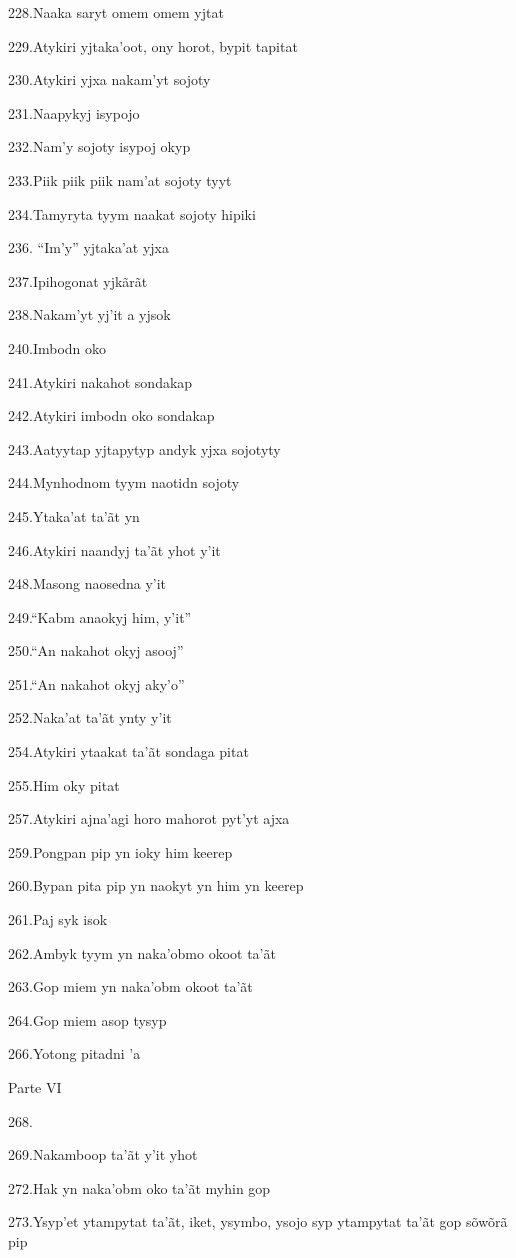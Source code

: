 228.Naaka saryt omem omem yjtat

229.Atykiri yjtaka'oot, ony horot, bypit tapitat

230.Atykiri yjxa nakam'yt sojoty

231.Naapykyj isypojo

232.Nam'y sojoty isypoj okyp

233.Piik piik piik nam'at sojoty tyyt

234.Tamyryta tyym naakat sojoty hipiki

236. ``Im'y'' yjtaka'at yjxa

237.Ipihogonat yjkãrãt

238.Nakam'yt yj'it a yjsok

240.Imbodn oko

241.Atykiri nakahot sondakap

242.Atykiri imbodn oko sondakap

243.Aatyytap yjtapytyp andyk yjxa sojotyty

244.Mynhodnom tyym naotidn sojoty

245.Ytaka'at ta'ãt yn

246.Atykiri naandyj ta'ãt yhot y'it

248.Masong naosedna y'it

249.``Kabm anaokyj him, y'it''

250.``An nakahot okyj asooj''

251.``An nakahot okyj aky'o''

252.Naka'at ta'ãt ynty y'it

254.Atykiri ytaakat ta'ãt sondaga pitat

255.Him oky pitat

257.Atykiri ajna'agi horo mahorot pyt'yt ajxa

259.Pongpan pip yn ioky him keerep

260.Bypan pita pip yn naokyt yn him yn keerep

261.Paj syk isok

262.Ambyk tyym yn naka'obmo okoot ta'ãt

263.Gop miem yn naka'obm okoot ta'ãt

264.Gop miem asop tysyp

266.Yotong pitadni 'a

Parte VI

268.

269.Nakamboop ta'ãt y'it yhot

272.Hak yn naka'obm oko ta'ãt myhin gop

273.Ysyp'et ytampytat ta'ãt, iket, ysymbo, ysojo syp ytampytat ta'ãt gop
sõwõrã pip

